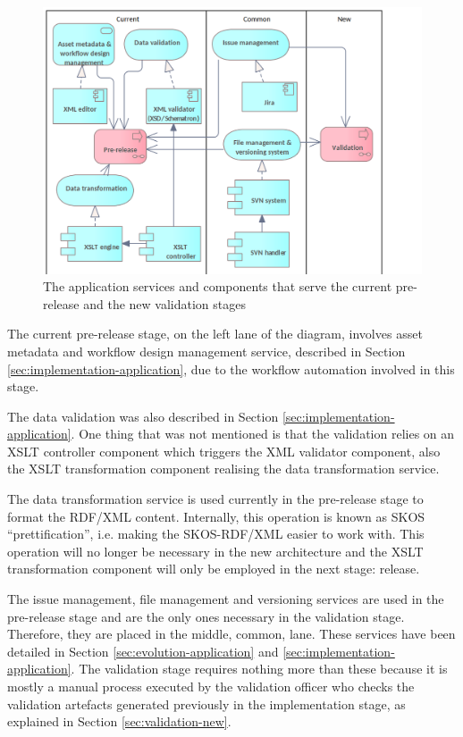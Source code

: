 	\begin{figure}[h]
		\centering
		\includegraphics[width=.9\textwidth]{images/application/Validation & Pre-release v3.png}
		\caption{The application services and components that serve the current pre-release and the new validation stages}
		\label{fig:application-validation}
	\end{figure}
	
	The current pre-release stage, on the left lane of the diagram, involves asset metadata and workflow design management service, described in Section \ref{sec:implementation-application}, due to the workflow automation involved in this stage. 
	
	The data validation was also described in Section \ref{sec:implementation-application}. One thing that was not mentioned is that the validation relies on an XSLT \citep{xslt3-Kay} controller component which triggers the XML validator component, also the XSLT transformation component realising the data transformation service.
	
	The data transformation service is used currently in the pre-release stage to format the RDF/XML content. Internally, this operation is known as SKOS ``prettification'', i.e. making the SKOS-RDF/XML easier to work with. This operation will no longer be necessary in the new architecture and the XSLT transformation component will only be employed in the next stage: release.
	
	The issue management, file management and versioning services are used in the pre-release stage and are the only ones necessary in the validation stage. Therefore, they are placed in the middle, common, lane. These services have been detailed in Section \ref{sec:evolution-application} and \ref{sec:implementation-application}. The validation stage requires nothing more than these because it is mostly a manual process executed by the validation officer who checks the validation artefacts generated previously in the implementation stage, as explained in Section \ref{sec:validation-new}.	

